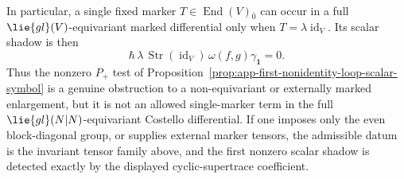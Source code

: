 \begin{prop}[Marked \(\mathcal B_{\operatorname{st}=0}\) and gauge-equivariant markers]
  In particular, a single fixed marker \(T\in\operatorname{End}(V){}_{\bar0}\)
  can occur in a full \(\lie{gl}(V)\)-equivariant marked differential only
  when \(T=\lambda\operatorname{id}_V\).  Its scalar shadow is then
  \[
    \hbar\,\lambda\,\operatorname{Str}(\operatorname{id}_V)\,
    \omega(f,g)\gamma_{\mathbf 1}=0 .
  \]
  Thus the nonzero \(P_+\) test of
  Proposition~\ref{prop:app-first-nonidentity-loop-scalar-symbol} is a
  genuine obstruction to a non-equivariant or externally marked
  enlargement, but it is not an allowed single-marker term in the full
  \(\lie{gl}(N|N)\)-equivariant Costello differential.  If one imposes
  only the even block-diagonal group, or supplies external marker
  tensors, the admissible datum is the invariant tensor family above, and
  the first nonzero scalar shadow is detected exactly by the displayed
  cyclic-supertrace coefficient.
\end{prop}

